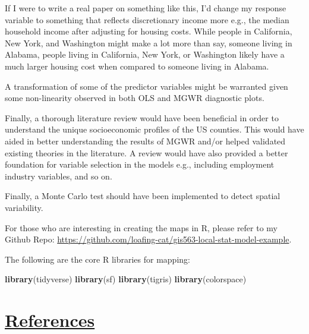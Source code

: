 \documentclass[
]{article}
\newenvironment{Shaded}{\begin{snugshade}}{\end{snugshade}}
\newcommand{\FunctionTok}[1]{\textcolor[rgb]{0.13,0.29,0.53}{\textbf{#1}}}
\newcommand{\NormalTok}[1]{#1}
\begin{document}
If I were to write a real paper on something like this, I'd change my
response variable to something that reflects discretionary income more
e.g., the median household income after adjusting for housing costs.
While people in California, New York, and Washington might make a lot
more than say, someone living in Alabama, people living in California,
New York, or Washington likely have a much larger housing cost when
compared to someone living in Alabama.

A transformation of some of the predictor variables might be warranted
given some non-linearity observed in both OLS and MGWR diagnostic plots.

Finally, a thorough literature review would have been beneficial in
order to understand the unique socioeconomic profiles of the US
counties. This would have aided in better understanding the results of
MGWR and/or helped validated existing theories in the literature. A
review would have also provided a better foundation for variable
selection in the models e.g., including employment industry variables,
and so on.

Finally, a Monte Carlo test should have been implemented to detect
spatial variability.

For those who are interesting in creating the maps in R, please refer to
my Github Repo:
\url{https://github.com/loafing-cat/gis563-local-stat-model-example}.

The following are the core R libraries for mapping:

\begin{Shaded}
\begin{Highlighting}[]
\FunctionTok{library}\NormalTok{(tidyverse)}
\FunctionTok{library}\NormalTok{(sf)}
\FunctionTok{library}\NormalTok{(tigris)}
\FunctionTok{library}\NormalTok{(colorspace)}
\end{Highlighting}
\end{Shaded}

\newpage

\section{\texorpdfstring{\ul{References}}{References}}\label{references}
\end{document}
